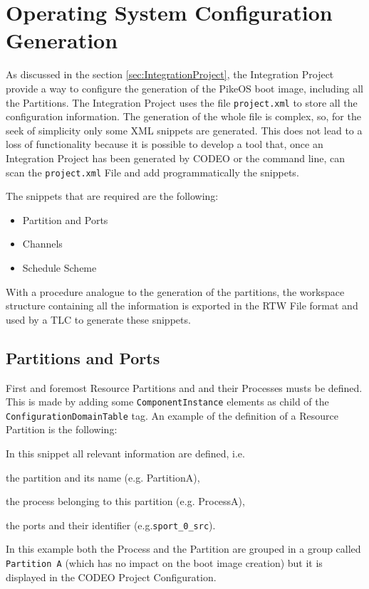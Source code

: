 \section{Operating System Configuration Generation}
As discussed in the section \ref{sec:IntegrationProject}, the Integration Project provide a way to configure the generation of the PikeOS boot image, including all the Partitions. The Integration Project uses the file \verb|project.xml| to store all the configuration information. The generation of the whole file is complex, so, for the seek of simplicity only some XML snippets are generated. This does not lead to a loss of functionality because it is possible to develop a tool that, once an Integration Project has been generated by CODEO or the command line, can scan the \verb|project.xml| File and add programmatically the snippets. 
\par The snippets that are required are the following:
\begin{itemize}
\item Partition and Ports
\item Channels
\item Schedule Scheme
\end{itemize}
With a procedure analogue to the generation of the partitions, the workspace structure containing all the information is exported in the RTW File format and used by a TLC to generate these snippets.

\subsection{Partitions and Ports}
First and foremost Resource Partitions and and their Processes musts be defined. This is made by adding some \verb|ComponentInstance| elements as child of the \verb|ConfigurationDomainTable| tag. An example of the definition of a Resource Partition is the following:

In this snippet all relevant information are defined, i.e. \begin{enumerate*}
\item the partition and its name (e.g. PartitionA),
\item the process belonging to this partition (e.g. ProcessA),
\item the ports and their identifier (e.g.\verb|sport_0_src|).
\end{enumerate*} In this example both the Process and the Partition are grouped in a group called \verb|Partition A| (which has no impact on the boot image creation) but it is displayed in the CODEO Project Configuration.

